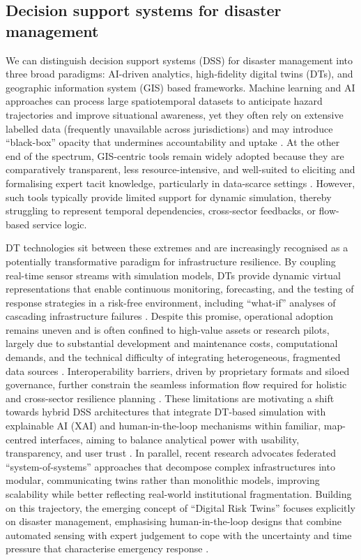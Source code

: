 \documentclass[review,12pt]{elsarticle}
\begin{document}
\subsection{Decision support systems for disaster management}
\label{subsec:dss_twins}
We can distinguish decision support systems (DSS) for disaster management into three broad paradigms: AI-driven analytics, high-fidelity digital twins (DTs), and geographic information system (GIS) based frameworks. Machine learning and AI approaches can process large spatiotemporal datasets to anticipate hazard trajectories and improve situational awareness, yet they often rely on extensive labelled data (frequently unavailable across jurisdictions) and may introduce ``black-box'' opacity that undermines accountability and uptake \cite{Kyrkou2023,karunakaran_ai-driven_2025}. At the other end of the spectrum, GIS-centric tools remain widely adopted because they are comparatively transparent, less resource-intensive, and well-suited to eliciting and formalising expert tacit knowledge, particularly in data-scarce settings \cite{adu2025role}. However, such tools typically provide limited support for dynamic simulation, thereby struggling to represent temporal dependencies, cross-sector feedbacks, or flow-based service logic.

DT technologies sit between these extremes and are increasingly recognised as a potentially transformative paradigm for infrastructure resilience. By coupling real-time sensor streams with simulation models, DTs provide dynamic virtual representations that enable continuous monitoring, forecasting, and the testing of response strategies in a risk-free environment, including ``what-if'' analyses of cascading infrastructure failures \cite{Inyang2024,Kaveh_Alhajj_2025,Afolabi2025,Zhu2025}. Despite this promise, operational adoption remains uneven and is often confined to high-value assets or research pilots, largely due to substantial development and maintenance costs, computational demands, and the technical difficulty of integrating heterogeneous, fragmented data sources \cite{Inyang2024,Karaduman2025}. Interoperability barriers, driven by proprietary formats and siloed governance, further constrain the seamless information flow required for holistic and cross-sector resilience planning \cite{Afolabi2025}. These limitations are motivating a shift towards hybrid DSS architectures that integrate DT-based simulation with explainable AI (XAI) and human-in-the-loop mechanisms within familiar, map-centred interfaces, aiming to balance analytical power with usability, transparency, and user trust \cite{Domfeh2025}. In parallel, recent research advocates federated ``system-of-systems'' approaches that decompose complex infrastructures into modular, communicating twins rather than monolithic models, improving scalability while better reflecting real-world institutional fragmentation. Building on this trajectory, the emerging concept of ``Digital Risk Twins'' focuses explicitly on disaster management, emphasising human-in-the-loop designs that combine automated sensing with expert judgement to cope with the uncertainty and time pressure that characterise emergency response \cite{ghaffarian_rethinking_2025}.
\end{document}
